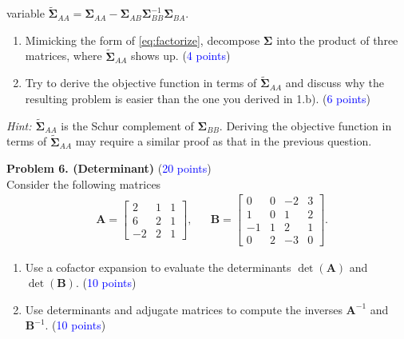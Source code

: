 \documentclass[english,onecolumn]{IEEEtran}
\begin{document}
\begin{enumerate}
variable $\tilde{\bm{\Sigma}}_{AA}=\bm{\Sigma}_{AA}-\bm{\Sigma}_{AB}\bm{\Sigma}_{BB}^{-1}\bm{\Sigma}_{BA}$.
\begin{enumerate}
\item Mimicking the form of \eqref{eq:factorize}, decompose $\bm{\Sigma}$
into the product of three matrices, where $\tilde{\bm{\Sigma}}_{AA}$ shows up. (\textcolor{blue}{4 points})
\item Try to derive the objective function in terms of $\tilde{\bm{\Sigma}}_{AA}$
and discuss why the resulting problem is easier than the one you derived
in 1.b). (\textcolor{blue}{6 points})
\end{enumerate}
\emph{Hint: $\tilde{\bm{\Sigma}}_{AA}$ }is the Schur complement of
$\boldsymbol{\Sigma}_{BB}$. Deriving the objective function in terms
of $\tilde{\bm{\Sigma}}_{AA}$ may require a similar proof as that
in the previous question.
\end{enumerate}


\newpage
\noindent\textbf{Problem 6. (Determinant)} (\textcolor{blue}{20 points}) \\
Consider the following matrices 
\begin{align*}
    &\mathbf{A} = 
    \begin{bmatrix}
        2 & 1 & 1 \\
        6 & 2 & 1 \\
        -2& 2 & 1  
    \end{bmatrix},
    & &\mathbf{B} = 
    \begin{bmatrix}
        0 & 0 &-2 & 3\\
        1 & 0 & 1 & 2\\
        -1& 1 & 2 & 1\\
        0 & 2 &-3 & 0 
    \end{bmatrix}.
\end{align*}
\begin{enumerate}
    \item  Use a cofactor expansion to evaluate the determinants $\det(\mathbf{A})$ and $\det(\mathbf{B})$. (\textcolor{blue}{10 points})
    \item Use determinants and adjugate matrices to compute the inverses $\mathbf{A}^{-1}$ and $\mathbf{B}^{-1}$. (\textcolor{blue}{10 points})
\end{enumerate}
\end{document}
